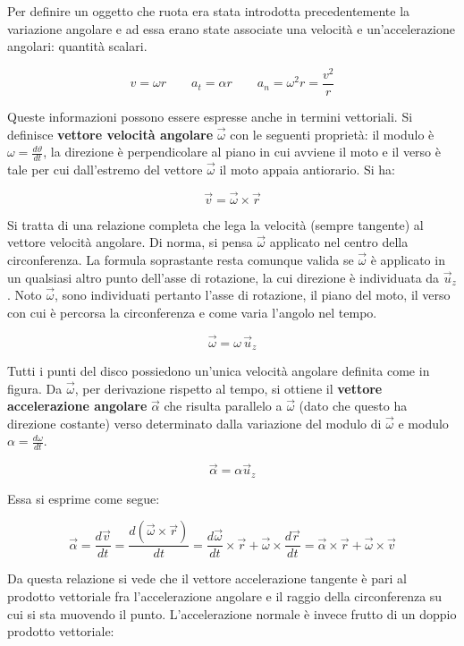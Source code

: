 Per definire un oggetto che ruota era stata introdotta precedentemente la variazione angolare e ad essa erano state associate una velocità e un'accelerazione angolari: quantità scalari.

\[
	v=\omega r \qquad a_t=\alpha r \qquad a_n=\omega^2 r=\frac{v^2}{r}
\]

Queste informazioni possono essere espresse anche in termini vettoriali. Si definisce \textbf{vettore velocità angolare} $\vec{\omega}$ con le seguenti proprietà: il modulo è $\omega=\frac{d\vartheta}{dt}$, la direzione è perpendicolare al piano in cui avviene il moto e il verso è tale per cui dall'estremo del vettore $\vec{\omega}$ il moto appaia antiorario. Si ha:

\[
	\vec{v}=\vec{\omega} \times \vec{r}
\]

Si tratta di una relazione completa che lega la velocità (sempre tangente) al vettore velocità angolare. Di norma, si pensa $\vec{\omega}$ applicato nel centro della circonferenza. La formula soprastante resta comunque valida se $\vec{\omega}$ è applicato in un qualsiasi altro punto dell'asse di rotazione, la cui direzione è individuata da $\vec{u}_z$. Noto $\vec{\omega}$, sono individuati pertanto l'asse di rotazione, il piano del moto, il verso con cui è percorsa la circonferenza e come varia l'angolo nel tempo.

\[
	\vec{\omega}=\omega\, \vec{u}_z
\]

Tutti i punti del disco possiedono un'unica velocità angolare definita come in figura. Da $\vec{\omega}$, per derivazione rispetto al tempo, si ottiene il \textbf{vettore accelerazione angolare} $\vec{\alpha}$ che risulta parallelo a $\vec{\omega}$ (dato che questo ha direzione costante) verso determinato dalla variazione del modulo di $\vec{\omega}$ e modulo $\alpha=\frac{d\omega}{dt}$.

\[
	\vec{\alpha}=\alpha \vec{u}_z
\]

Essa si esprime come segue:

\[
	\vec{\alpha}=\frac{d\vec{v}}{dt}=\frac{d(\vec{\omega} \times \vec{r})}{dt}=\frac{d\vec{\omega}}{dt} \times \vec{r}+\vec{\omega} \times \frac{d\vec{r}}{dt}=\vec{\alpha} \times \vec{r} + \vec{\omega} \times \vec{v}
\]

Da questa relazione si vede che il vettore accelerazione tangente è pari al prodotto vettoriale fra l'accelerazione angolare e il raggio della circonferenza su cui si sta muovendo il punto. L'accelerazione normale è invece frutto di un doppio prodotto vettoriale:


